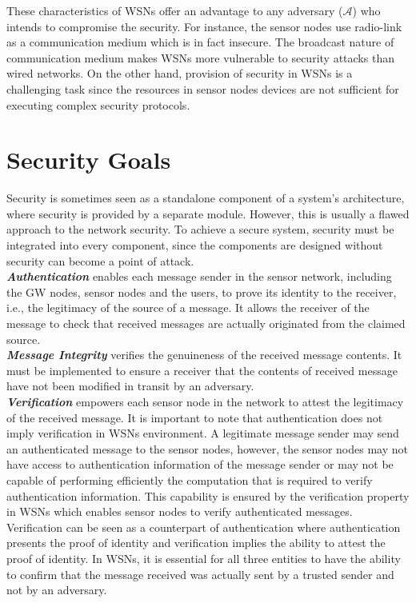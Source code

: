 \documentclass[a4paper,12pt]{report}
\begin{document}
These characteristics of WSNs offer an advantage to any adversary
($\mathcal{A}$) who intends to compromise  the security. For
instance, the sensor nodes use radio-link as a communication medium
which is in fact insecure. The broadcast nature of communication
medium makes WSNs more vulnerable to security attacks than wired
networks. On the other hand, provision of security in WSNs is a
challenging task since the resources in sensor nodes devices are not
sufficient for executing complex security protocols.

\section{Security Goals}
Security is sometimes seen as a standalone component of a system's
architecture, where security is provided by a separate module.
However, this is usually a flawed approach to the network security.
To achieve a secure system, security must be integrated into every
component, since the components are designed without security can
become a point of attack.\\

\noindent \textit{\textbf{Authentication}} enables each message
sender in the sensor network, including the GW nodes, sensor nodes
and the users, to prove its identity to the receiver, i.e., the
legitimacy of the source of a message. It allows the receiver of the
message to check that received messages are actually originated from
the claimed source.\\

\noindent \textit{\textbf{Message Integrity}} verifies the
genuineness of the received message contents. It must be implemented
to ensure a receiver that the contents of received message have not
been modified in transit by an adversary.\\

\noindent \textit{\textbf{Verification}} empowers each sensor node
in the network to attest the legitimacy of the received message. It
is important to note that authentication does not imply verification
in WSNs environment. A legitimate message sender may send an
authenticated message to the sensor nodes, however, the sensor nodes
may not have access to authentication information of the message
sender or may not be capable of performing efficiently the
computation that is required to verify authentication information.
This capability is ensured by the verification property in WSNs
which enables sensor nodes to verify authenticated messages.
Verification can be seen as a counterpart of authentication where
authentication presents the proof of identity and verification
implies the ability to attest the proof of identity. In WSNs, it is
essential for all three entities to have the ability to confirm that
the message received was actually sent by a trusted sender and not
by an adversary.\\
\end{document}
